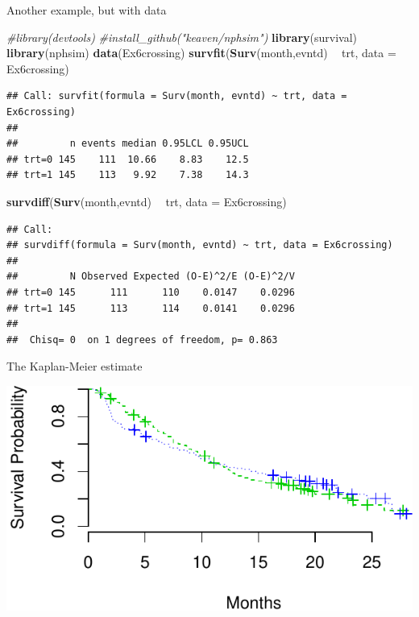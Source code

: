 \documentclass[ignorenonframetext,]{beamer}
\newenvironment{Shaded}{\begin{snugshade}}{\end{snugshade}}
\newcommand{\CommentTok}[1]{\textcolor[rgb]{0.56,0.35,0.01}{\textit{#1}}}
\newcommand{\DataTypeTok}[1]{\textcolor[rgb]{0.13,0.29,0.53}{#1}}
\newcommand{\KeywordTok}[1]{\textcolor[rgb]{0.13,0.29,0.53}{\textbf{#1}}}
\newcommand{\NormalTok}[1]{#1}
\newcommand{\OperatorTok}[1]{\textcolor[rgb]{0.81,0.36,0.00}{\textbf{#1}}}
\newcommand{\StringTok}[1]{\textcolor[rgb]{0.31,0.60,0.02}{#1}}
\begin{document}
\begin{frame}[fragile]{%
\protect\hypertarget{another-example-but-with-data}{%
Another example, but with data}}

\scriptsize

\begin{Shaded}
\begin{Highlighting}[]
\CommentTok{#library(devtools)}
\CommentTok{#install_github("keaven/nphsim")}
\KeywordTok{library}\NormalTok{(survival)}
\KeywordTok{library}\NormalTok{(nphsim)}
\KeywordTok{data}\NormalTok{(Ex6crossing)}
\KeywordTok{survfit}\NormalTok{(}\KeywordTok{Surv}\NormalTok{(month,evntd) }\OperatorTok{~}\StringTok{ }\NormalTok{trt, }\DataTypeTok{data =}\NormalTok{ Ex6crossing)}
\end{Highlighting}
\end{Shaded}

\begin{verbatim}
## Call: survfit(formula = Surv(month, evntd) ~ trt, data = Ex6crossing)
## 
##         n events median 0.95LCL 0.95UCL
## trt=0 145    111  10.66    8.83    12.5
## trt=1 145    113   9.92    7.38    14.3
\end{verbatim}

\begin{Shaded}
\begin{Highlighting}[]
\KeywordTok{survdiff}\NormalTok{(}\KeywordTok{Surv}\NormalTok{(month,evntd) }\OperatorTok{~}\StringTok{ }\NormalTok{trt, }\DataTypeTok{data =}\NormalTok{ Ex6crossing)}
\end{Highlighting}
\end{Shaded}

\begin{verbatim}
## Call:
## survdiff(formula = Surv(month, evntd) ~ trt, data = Ex6crossing)
## 
##         N Observed Expected (O-E)^2/E (O-E)^2/V
## trt=0 145      111      110    0.0147    0.0296
## trt=1 145      113      114    0.0141    0.0296
## 
##  Chisq= 0  on 1 degrees of freedom, p= 0.863
\end{verbatim}

\end{frame}

\begin{frame}{%
\protect\hypertarget{the-kaplan-meier-estimate}{%
The Kaplan-Meier estimate}}

\includegraphics{unit_03_significance_testing_files/figure-beamer/unnamed-chunk-10-1.pdf}

\end{frame}
\end{document}
